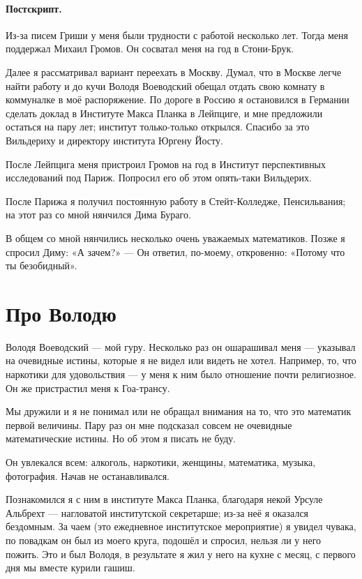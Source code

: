 \documentclass{book}
\begin{document}
\paragraph{Постскрипт.}
Из-за писем Гриши у меня были трудности с работой несколько лет.
Тогда меня поддержал Михаил Громов.
Он сосватал меня на год в Стони-Брук.

Далее я рассматривал вариант переехать в Москву.
Думал, что в Москве легче найти работу и до кучи Володя Воеводский обещал отдать свою комнату в коммуналке в моё распоряжение.
По дороге в Россию я остановился в Германии сделать доклад в Институте Макса Планка в Лейпциге, и мне предложили остаться на пару лет; 
институт только-только открылся.
Спасибо за это Вильдериху и директору института Юргену Йосту.

После Лейпцига меня пристроил Громов на год в Институт перспективных исследований под Париж.
Попросил его об этом опять-таки Вильдерих.

После Парижа я получил постоянную работу в Стейт-Колледже, Пенсильвания;
на этот раз со мной нянчился Дима Бураго.

В общем со мной нянчились несколько очень уважаемых математиков.
Позже я спросил Диму: «А зачем?» --- Он ответил, по-моему, откровенно: «Потому что ты безобидный».

\section*{Про Володю}

Володя Воеводский --- мой гуру.
Несколько раз он ошарашивал меня --- указывал на очевидные истины, которые я не видел или видеть не хотел.
Например, то, что наркотики для удовольствия --- у меня к ним было отношение почти религиозное.
Он же пристрастил меня к Гоа-трансу.

Мы дружили и я не понимал или не обращал внимания на то, что это математик первой величины.
Пару раз он мне подсказал совсем не очевидные математические истины.
Но об этом я писать не буду.

Он увлекался всем: алкоголь, наркотики, женщины, математика, музыка, фотография.
Начав не останавливался.

Познакомился я с ним в институте Макса Планка, благодаря некой Урсуле Альбрехт --- нагловатой институтской секретарше;
из-за неё я оказался бездомным.
За чаем (это ежедневное институтское мероприятие) я увидел чувака, по повадкам он был из моего круга, подошёл и спросил, нельзя ли у него пожить.
Это и был Володя, в результате я жил у него на кухне с месяц, с первого дня мы вместе курили гашиш.
\end{document}
